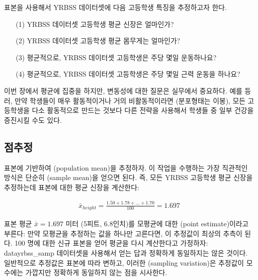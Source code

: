 
표본을 사용해서 YRBSS 데이터셋에 다음 고등학생 특징을 추정하고자 한다.
\begin{itemize}
\setlength{\itemsep}{0mm}
\item[(1)] YRBSS 데이터셋 고등학생 평균 신장은 얼마인가?
\item[(2)] YRBSS 데이터셋 고등학생 평균 몸무게는 얼마인가?
\item[(3)] 평균적으로, YRBSS 데이터셋 고등학생은 주당 몇일 운동하나요?
\item[(4)] 평균적으로, YRBSS 데이터셋 고등학생은 주당 몇일 근력 운동을 하나요?
\end{itemize}

이번 장에서 평균에 집중을 하지만, 변동성에 대한 질문은 실무에서 중요하다. 예를 등러, 만약 학생들이 매우 활동적이거나 거의 비활동적이라면 (분포형태는 이봉), 모든 고등학생을 다소 활동적으로 만드는 것보다 다른 전략을 사용해서 학생들 중 일부 건강을 증진시킬 수도 있다.


\subsection{점추정}
\label{pointEstimates}


표본에 기반하여 (population mean)을 추정하자. 이 작업을 수행하는 가장 직관적인 방식은 단순히 (sample mean)을 얻으면 된다. 즉, 모든 YRBSS 고등학생 평균 신장을 추정하는데 표본에 대한 평균 신장을 계산한다:

\begin{eqnarray*}
\bar{x}_{height} = \frac{1.50 + 1.78 + \dots + 1.70}{100} = 1.697
\end{eqnarray*}

표본 평균 $\bar{x} = 1.697$ 미터 (5피트, 6.8인치)를 모평균에 대한 (point estimate)이라고 부른다: 만약 모평균을 추정하는 값을 하나만 고른다면, 이 추정값이 최상의 추측이 된다. 100 명에 대한 신규 표본을 얻어 평균을 다시 계산한다고 가정하자: data{yrbss\_samp} 데이터셋을 사용해서 얻는 답과 정확하게 동일하지는 않은 것이다. 일반적으로 추정값은 표본에 따라 변하고, 이러한 (sampling variation)은 추정값이 모수에는 가깝지만 정확하게 동일하지 않는 점을 시사한다.

